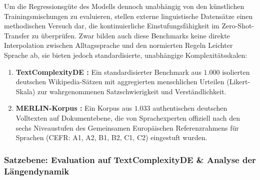 Um die Regressionsgüte des Modells dennoch unabhängig von den künstlichen Trainingsmischungen zu evaluieren, stellen externe linguistische Datensätze einen methodischen Versuch dar, die kontinuierliche Einstufungsfähigkeit im Zero-Shot-Transfer zu überprüfen. Zwar bilden auch diese Benchmarks keine direkte Interpolation zwischen Alltagssprache und den normierten Regeln Leichter Sprache ab, sie bieten jedoch standardisierte, unabhängige Komplexitätsskalen:
\begin{enumerate}
    \item \textbf{TextComplexityDE \citep{naderi2019textcomplexityde}:} Ein standardisierter Benchmark aus $1.000$ isolierten deutschen Wikipedia-Sätzen mit aggregierten menschlichen Urteilen (Likert-Skala) zur wahrgenommenen Satzschwierigkeit und Verständlichkeit.
    \item \textbf{MERLIN-Korpus \citep{boyd2014merlin}:} Ein Korpus aus $1.033$ authentischen deutschen Volltexten auf Dokumentebene, die von Sprachexperten offiziell nach den sechs Niveaustufen des Gemeinsamen Europäischen Referenzrahmens für Sprachen (CEFR: A1, A2, B1, B2, C1, C2) eingestuft wurden.
\end{enumerate}

\subsubsection{Satzebene: Evaluation auf TextComplexityDE \& Analyse der Längendynamik}
\label{sec:eval_textcomplexityde}

